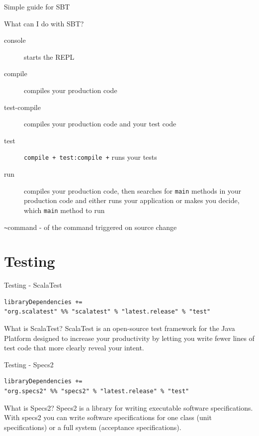 \begin{frame}[fragile]{Simple guide for SBT}
\begin{block}{What can I do with SBT?}
\begin{description}
\item[console] starts the REPL
\item[compile] compiles your production code
\item[test-compile] compiles your production code and your test code
\item[test] \lstinline!compile + test:compile +! runs your tests
\item[run] compiles your production code, then searches for \lstinline!main!
methods in your production code and either runs your application or makes you
decide, which \lstinline!main! method to run
\end{description}
\end{block}
\pause
\begin{center}
\lstinline!~!command -  of the command
triggered on source change
\end{center}
\end{frame}

\section{Testing}
\begin{frame}[fragile]{Testing - ScalaTest}
\begin{center}
\end{center}
\begin{lstlisting}
libraryDependencies +=
"org.scalatest" %% "scalatest" % "latest.release" % "test"
\end{lstlisting}
\begin{block}{What is ScalaTest?}
ScalaTest is an open-source test framework for the Java Platform designed to
increase your productivity by letting you write fewer lines of test code that
more clearly reveal your intent.
\end{block}
\end{frame}
\begin{frame}[fragile]{Testing - Specs2}
\begin{center}
\end{center}
\begin{lstlisting}
libraryDependencies +=
"org.specs2" %% "specs2" % "latest.release" % "test"
\end{lstlisting}
\begin{block}{What is Specs2?}
Specs2 is a library for writing executable software specifications. With specs2
you can write software specifications for one class (unit specifications) or a
full system (acceptance specifications).
\end{block}
\end{frame}


